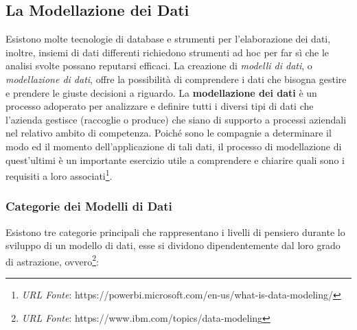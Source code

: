 \subsection{La Modellazione dei Dati}
Esistono molte tecnologie di database e strumenti per l'elaborazione dei dati, inoltre, insiemi di dati differenti richiedono strumenti ad hoc per far sì che le analisi svolte possano reputarsi efficaci. La creazione di \textit{modelli di dati}, o \textit{modellazione di dati}, offre la possibilità di comprendere i dati che bisogna gestire e prendere le giuste decisioni a riguardo.
La \textbf{modellazione dei dati} è un processo adoperato per analizzare e definire tutti i diversi tipi di dati che l'azienda gestisce (raccoglie o produce) che siano di supporto a processi aziendali nel relativo ambito di competenza. Poiché sono le compagnie a determinare il modo ed il momento dell'applicazione di tali dati, il processo di modellazione di quest'ultimi è un importante esercizio utile a comprendere e chiarire quali sono i requisiti a loro associati\footnote{\textit{URL Fonte}: https://powerbi.microsoft.com/en-us/what-is-data-modeling/}.

\subsubsection{Categorie dei Modelli di Dati}

Esistono tre categorie principali che rappresentano i livelli di pensiero durante lo sviluppo di un modello di dati, esse si dividono dipendentemente dal loro grado di astrazione, ovvero\footnote{\textit{URL Fonte}: https://www.ibm.com/topics/data-modeling}:


